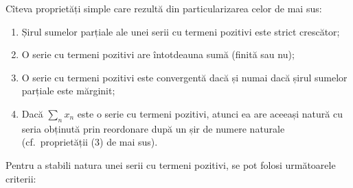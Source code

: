 \documentclass[11pt,a4paper]{article}
\theoremstyle{dotless}
\theoremstyle{dotlessdr}
\begin{document}
Cîteva proprietăți simple care rezultă din particularizarea celor de mai sus:

\begin{enumerate}[(1)]
  \item Șirul sumelor parțiale ale unei serii cu termeni pozitivi este strict
    crescător;
  \item O serie cu termeni pozitivi are întotdeauna sumă (finită sau nu);
  \item O serie cu termeni pozitivi este convergentă dacă și numai dacă șirul
    sumelor parțiale este mărginit;
  \item Dacă $\sum_n x_n$ este o serie cu termeni pozitivi, atunci ea are aceeași
    natură cu seria obținută prin reordonare după un șir de numere naturale (cf.\
    proprietății (3) de mai sus). 
\end{enumerate}

Pentru a stabili natura unei serii cu termeni pozitivi, se pot folosi următoarele
criterii:
\end{document}
